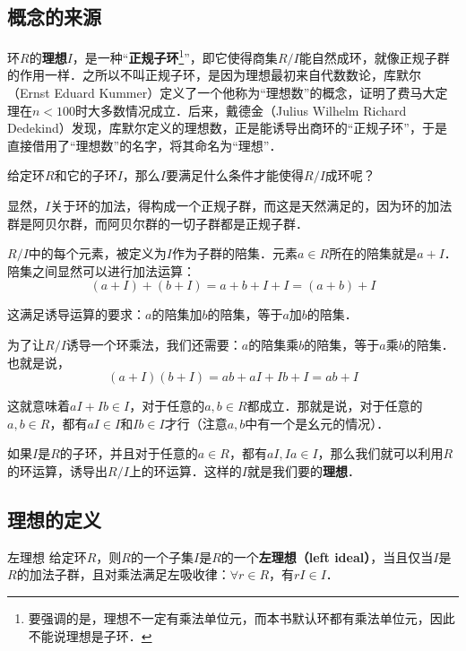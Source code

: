 
\subsection{概念的来源}

环$R$的\textbf{理想}$I$，是一种“\textbf{正规子环}\footnote{要强调的是，理想不一定有乘法单位元，而本书默认环都有乘法单位元，因此不能说理想是子环．}”，即它使得商集$R/I$能自然成环，就像正规子群的作用一样．之所以不叫正规子环，是因为理想最初来自代数数论，库默尔（Ernst Eduard Kummer）定义了一个他称为“理想数”的概念，证明了费马大定理在$n<100$时大多数情况成立．后来，戴德金（Julius Wilhelm Richard Dedekind）发现，库默尔定义的理想数，正是能诱导出商环的“正规子环”，于是直接借用了“理想数”的名字，将其命名为“理想”．

给定环$R$和它的子环$I$，那么$I$要满足什么条件才能使得$R/I$成环呢？

显然，$I$关于环的加法，得构成一个正规子群，而这是天然满足的，因为环的加法群是阿贝尔群，而阿贝尔群的一切子群都是正规子群．

$R/I$中的每个元素，被定义为$I$作为子群的陪集．元素$a\in R$所在的陪集就是$a+I$．陪集之间显然可以进行加法运算：
\begin{equation}
(a+I)+(b+I)=a+b+I+I=(a+b)+I
\end{equation}

这满足诱导运算的要求：$a$的陪集加$b$的陪集，等于$a$加$b$的陪集．

为了让$R/I$诱导一个环乘法，我们还需要：$a$的陪集乘$b$的陪集，等于$a$乘$b$的陪集．也就是说，
\begin{equation}
(a+I)(b+I)=ab+aI+Ib+I=ab+I
\end{equation}

这就意味着$aI+Ib\in I$，对于任意的$a, b\in R$都成立．那就是说，对于任意的$a, b\in R$，都有$aI\in I$和$Ib\in I$才行（注意$a, b$中有一个是幺元的情况）．

如果$I$是$R$的子环，并且对于任意的$a\in R$，都有$aI, Ia\in I$，那么我们就可以利用$R$的环运算，诱导出$R/I$上的环运算．这样的$I$就是我们要的\textbf{理想}．

\subsection{理想的定义}

\begin{definition}{左理想}
给定环$R$，则$R$的一个子集$I$是$R$的一个\textbf{左理想（left ideal）}，当且仅当$I$是$R$的加法子群，且对乘法满足左吸收律：$\forall r\in R$，有$rI\in I$．
\end{definition}

